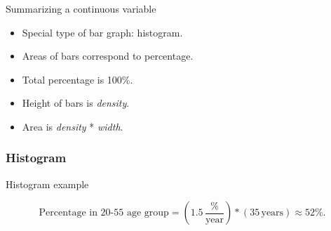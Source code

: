 \documentclass[handout]{beamer}
\begin{document}

   \begin{frame} 

   \begin{block}
   {Summarizing a continuous variable}
   \begin{itemize}

   \item Special type of bar graph: histogram.
   \item Areas of bars correspond to percentage.
   \item Total percentage is 100\%.
   \item Height of bars is {\em density}.
   \item Area is {\em density} * {\em width}.
   \end{itemize}
   \end{block}
   \end{frame}



   \begin{frame}
   \frametitle{Histogram}
   \begin{center}
   \end{center}

   \end{frame}


   \begin{frame} 

   \begin{block}
   {Histogram example}

   $$
   \text{Percentage in 20-55 age group} = \left(1.5 \, \frac{\%}{\text{year}} \right) * \left( 35 \, \text{years} \right) \approx 52 \%.
   $$

   \end{block}
   \end{frame}

\end{document}

